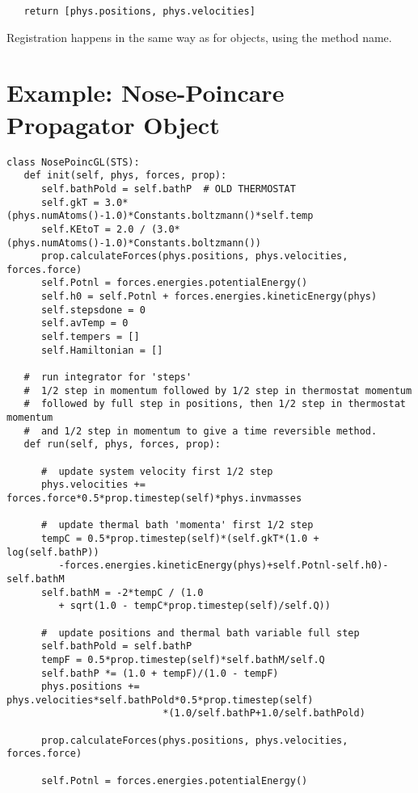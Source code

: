 \documentclass[11pt]{report}
\begin{document}
\begin{verbatim}
   return [phys.positions, phys.velocities]
\end{verbatim}

Registration happens in the same way as for objects, using the
method name.

\newpage
\section{Example: Nose-Poincare Propagator Object}
\begin{verbatim}
class NosePoincGL(STS):
   def init(self, phys, forces, prop):
      self.bathPold = self.bathP  # OLD THERMOSTAT
      self.gkT = 3.0*(phys.numAtoms()-1.0)*Constants.boltzmann()*self.temp
      self.KEtoT = 2.0 / (3.0*(phys.numAtoms()-1.0)*Constants.boltzmann())
      prop.calculateForces(phys.positions, phys.velocities, forces.force)
      self.Potnl = forces.energies.potentialEnergy()
      self.h0 = self.Potnl + forces.energies.kineticEnergy(phys)
      self.stepsdone = 0
      self.avTemp = 0
      self.tempers = []
      self.Hamiltonian = []

   #  run integrator for 'steps'
   #  1/2 step in momentum followed by 1/2 step in thermostat momentum
   #  followed by full step in positions, then 1/2 step in thermostat momentum
   #  and 1/2 step in momentum to give a time reversible method.
   def run(self, phys, forces, prop):

      #  update system velocity first 1/2 step
      phys.velocities += forces.force*0.5*prop.timestep(self)*phys.invmasses

      #  update thermal bath 'momenta' first 1/2 step
      tempC = 0.5*prop.timestep(self)*(self.gkT*(1.0 + log(self.bathP))
         -forces.energies.kineticEnergy(phys)+self.Potnl-self.h0)-self.bathM
      self.bathM = -2*tempC / (1.0 
         + sqrt(1.0 - tempC*prop.timestep(self)/self.Q))

      #  update positions and thermal bath variable full step
      self.bathPold = self.bathP
      tempF = 0.5*prop.timestep(self)*self.bathM/self.Q
      self.bathP *= (1.0 + tempF)/(1.0 - tempF)
      phys.positions += phys.velocities*self.bathPold*0.5*prop.timestep(self)
                           *(1.0/self.bathP+1.0/self.bathPold)

      prop.calculateForces(phys.positions, phys.velocities, forces.force)

      self.Potnl = forces.energies.potentialEnergy()


\end{verbatim}
\end{document}
